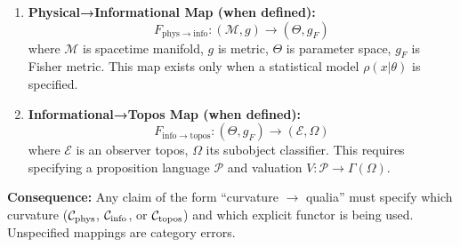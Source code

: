 \begin{enumerate}
    \item \textbf{Physical→Informational Map (when defined):} 
    \[
    F_{\mathrm{phys\to info}}: (\mathcal{M}, g) \to (\Theta, g_F)
    \]
    where $\mathcal{M}$ is spacetime manifold, $g$ is metric, $\Theta$ is parameter space, $g_F$ is Fisher metric. This map exists only when a statistical model $\rho(x|\theta)$ is specified.
    
    \item \textbf{Informational→Topos Map (when defined):}
    \[
    F_{\mathrm{info\to topos}}: (\Theta, g_F) \to (\mathcal{E}, \Omega)
    \]
    where $\mathcal{E}$ is an observer topos, $\Omega$ its subobject classifier. This requires specifying a proposition language $\mathcal{P}$ and valuation $V: \mathcal{P} \to \Gamma(\Omega)$.
\end{enumerate}

\textbf{Consequence:} Any claim of the form ``curvature $\to$ qualia'' must specify which curvature ($\mathcal{C}_{\mathrm{phys}}$, $\mathcal{C}_{\mathrm{info}}$, or $\mathcal{C}_{\mathrm{topos}}$) and which explicit functor is being used. Unspecified mappings are category errors.
